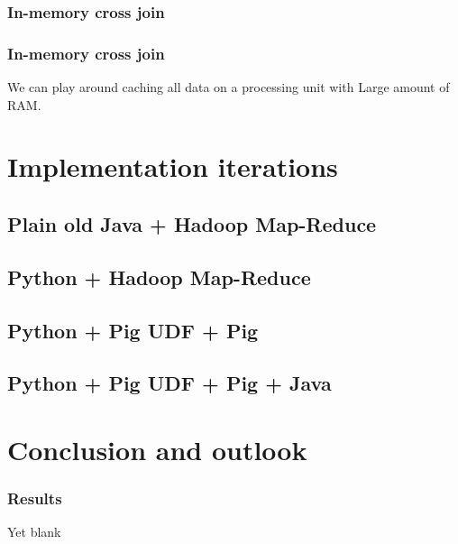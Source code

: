 \documentclass[handout]{beamer}
\begin{document}

\subsubsection{In-memory cross join}


\begin{frame}
\frametitle{\bf In-memory cross join}

We can play around caching all data on a processing unit with Large amount of RAM.

\end{frame}


\section{Implementation iterations}

\subsection{Plain old Java + Hadoop Map-Reduce}

\subsection{Python + Hadoop Map-Reduce}

\subsection{Python + Pig UDF + Pig}

\subsection{Python + Pig UDF + Pig + Java}

\begin{frame}
\frametitle{\bf }
\end{frame}


\section{Conclusion and outlook}

\begin{frame}
\frametitle{\bf Results}

Yet blank

\end{frame}
\end{document}
